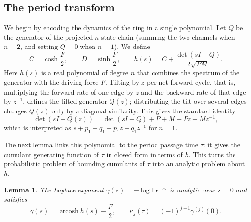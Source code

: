 \documentclass[11pt]{article}
\newtheorem{lemma}[theorem]{Lemma}
\theoremstyle{remark}
\newcommand{\E}{\mathbb E}
\newcommand{\acosh}{\operatorname{arcosh}}
\begin{document}
\subsection{The period transform}
We begin by encoding the dynamics of the ring in a single polynomial. Let
$Q$ be the generator of the projected $n$-state chain (summing the two
channels when $n=2$, and setting $Q=0$ when $n=1$). We define
\begin{equation}\label{eq:h}
C=\cosh\frac F2,\qquad D=\sinh\frac F2,\qquad
h(s)=C+\frac{\det(sI-Q)}{2\sqrt{PM}}.
\end{equation}
Here $h(s)$ is a real polynomial of degree $n$ that combines the spectrum of
the generator with the driving force $F$. Tilting by $z$ per net forward
cycle, that is, multiplying the forward rate of one edge by $z$ and the
backward rate of that edge by $z^{-1}$, defines the tilted generator
$Q(z)$; distributing the tilt over several edges changes $Q(z)$ only by a
diagonal similarity. This gives the standard identity~\cite{wb}
\begin{equation}\label{eq:tilt}
\det(sI-Q(z))=\det(sI-Q)+P+M-Pz-Mz^{-1},
\end{equation}
which is interpreted as $s+p_1+q_1-p_1z-q_1z^{-1}$ for $n=1$.

The next lemma links this polynomial to the period passage time $\tau$: it
gives the cumulant generating function of $\tau$ in closed form in terms of
$h$. This turns the probabilistic problem of bounding cumulants of $\tau$
into an analytic problem about $h$.

\begin{lemma}\label{lem:transform}
The Laplace exponent $\gamma(s)=-\log\E e^{-s\tau}$ is analytic near $s=0$
and satisfies
\begin{equation}\label{eq:gamma}
\gamma(s)=\acosh h(s)-\frac F2,\qquad
\kappa_j(\tau)=(-1)^{j-1}\gamma^{(j)}(0).
\end{equation}
\end{lemma}
\end{document}

